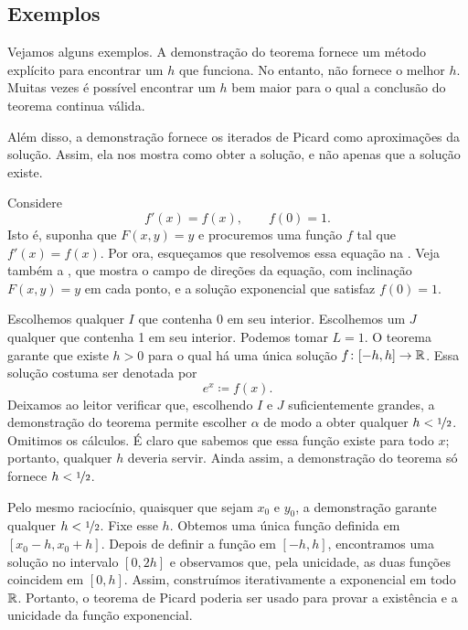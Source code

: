 \subsection{Exemplos}

Vejamos alguns exemplos. A demonstração do teorema fornece um método
explícito para encontrar um $h$ que funciona. No entanto, não fornece o
melhor $h$. Muitas vezes é possível encontrar um $h$ bem maior para o qual
a conclusão do teorema continua válida.

Além disso, a demonstração fornece os iterados de Picard como aproximações
da solução. Assim, ela nos mostra como obter a solução, e não apenas que a
solução existe.

\begin{example} \label{example:picardexponential}
Considere
\begin{equation*}
f'(x) = f(x), \qquad f(0) = 1 .
\end{equation*}
Isto é, suponha que $F(x,y) = y$ e procuremos uma função $f$ tal que
$f'(x) = f(x)$.
Por ora, esqueçamos que resolvemos essa equação na
. Veja também a , que mostra
o campo de direções da equação, com inclinação $F(x,y)=y$ em cada ponto,
e a solução exponencial que satisfaz $f(0)=1$.

Escolhemos qualquer $I$ que contenha 0 em seu interior.
Escolhemos um $J$ qualquer que contenha 1 em seu interior. Podemos tomar
$L = 1$.
O teorema garante que existe $h > 0$ para o qual há uma única solução
$f \colon [-h,h] \to {\mathbb{R}}$. Essa solução costuma ser denotada por
\begin{equation*}
e^x \coloneqq f(x) .
\end{equation*}
Deixamos ao leitor verificar que, escolhendo $I$ e $J$ suficientemente
grandes, a demonstração do teorema permite escolher $\alpha$ de modo a
obter qualquer $h < \nicefrac{1}{2}$. Omitimos os cálculos.
É claro que sabemos %
que essa função existe para todo $x$; portanto, qualquer $h$ deveria
servir. Ainda assim, a demonstração do teorema só fornece $h < \nicefrac{1}{2}$.

Pelo mesmo raciocínio, quaisquer que sejam $x_0$ e $y_0$, a demonstração
garante qualquer $h < \nicefrac{1}{2}$.
Fixe esse $h$.
Obtemos uma única função definida em $[x_0-h,x_0+h]$. Depois de definir a
função em $[-h,h]$, encontramos uma solução no intervalo $[0,2h]$ e
observamos que, pela unicidade, as duas funções coincidem em $[0,h]$.
Assim, construímos iterativamente a exponencial em todo ${\mathbb{R}}$.
Portanto, o teorema de Picard poderia ser usado para provar a existência e
a unicidade da função exponencial.


\end{example}
